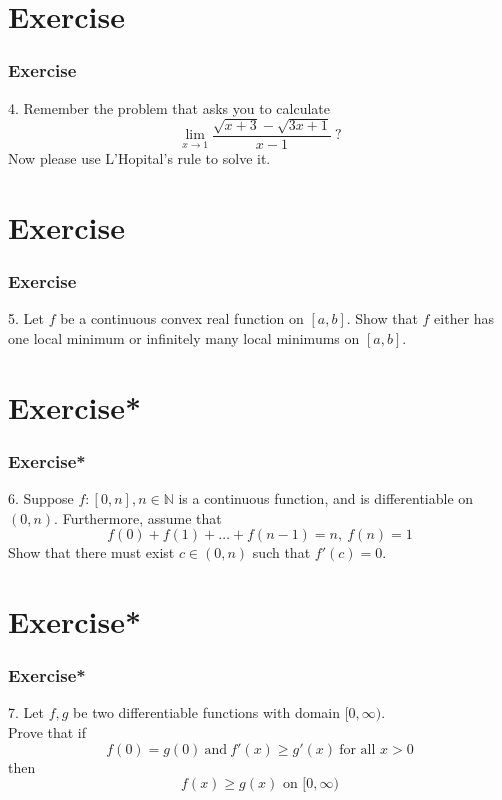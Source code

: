 \documentclass[12pt, t]{beamer}
\begin{document}
\section{Exercise}
\begin{frame}
    \frametitle{Exercise}
    4. Remember the problem that asks you to calculate
    \begin{equation*}
        \underset{x\rightarrow 1}{\lim}\frac{\sqrt{x+3}-\sqrt{3x+1}}{x-1}\ ?
    \end{equation*}
    Now please use L'Hopital's rule to solve it.
\end{frame}

\section{Exercise}
\begin{frame}
    \frametitle{Exercise}
    5. Let $f$ be a continuous convex real function on $[a,b]$. Show that $f$ either has one local minimum or infinitely many local minimums on $[a,b]$.
\end{frame}


\section{Exercise*}
\begin{frame}
    \frametitle{Exercise*}
    6. Suppose $f:[0,n],n\in \mathbb{N}$ is a continuous function, and is differentiable on $(0,n)$. Furthermore, assume that
    \begin{equation*}
        f(0)+f(1)+\dots+f(n-1)=n,\ f(n)=1
    \end{equation*}
    Show that there must exist $c\in (0,n)$ such that $f'(c)=0$.

\end{frame}


\section{Exercise*}
\begin{frame}
    \frametitle{Exercise*}
    7. Let $f,g$ be two differentiable functions with domain $[0,\infty)$.\\
    Prove that if
    \begin{equation*}
        f(0)=g(0)\ \text{and} \ f'(x)\geq g'(x)\ \text{for all }x>0
    \end{equation*}
    then
    \begin{equation*}
        f(x)\geq g(x) \text{ on } [0,\infty)
    \end{equation*}
\end{frame}
\end{document}

